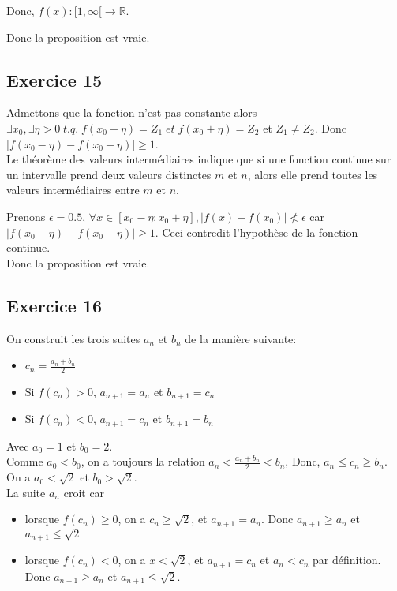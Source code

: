 \documentclass[]{book}
\theoremstyle{definition}
\newcommand{\bb}[1]{\mathbb{#1}}
\newcommand{\R}{\bb{R}}
\begin{document}
Donc, $f(x): [1,\infty[ \to \R$.


Donc la proposition est vraie.


\subsection*{Exercice 15}
Admettons que la fonction n'est pas constante alors $\exists x_0, \exists \eta > 0\; t.q.\; f(x_0 - \eta) = Z_1\; et \; f(x_0 + \eta) = Z_2$ et $Z_1 \neq Z_2$. Donc $|f(x_0 - \eta) - f(x_0 + \eta)| \ge 1$.\\ 


Le th\'eor\`eme des valeurs intermédiaires indique que si une fonction continue sur un intervalle prend deux valeurs distinctes $m$ et $n$, alors elle prend toutes les valeurs intermédiaires entre $m$ et $n$.

Prenons $\epsilon = 0.5$, $\forall x \in [x_0 - \eta;x_0 + \eta],  |f(x) - f(x_0)| \nless \epsilon$ car $|f(x_0 - \eta) - f(x_0 + \eta)| \ge 1$. Ceci contredit l'hypoth\`ese de la fonction continue.\\

Donc la proposition est vraie.

\subsection*{Exercice 16}
On construit les trois suites $a_n$ et $b_n$ de la mani\`ere suivante:
\begin{itemize}
\item $c_n = \frac{a_n + b_n}{2}$
\item Si $f(c_n) > 0$, $a_{n+1} = a_n$ et $b_{n+1} = c_n$
\item Si $f(c_n) < 0$, $a_{n+1} = c_n$ et $b_{n+1} = b_n$
\end{itemize}
Avec $a_0 = 1$ et $b_0 = 2$.\\

Comme $a_0 < b_0$, on a toujours la relation $a_n < \frac{a_n+b_n}{2} < b_n$, Donc, $a_n \le c_n \ge b_n$.\\
On a $a_0 < \sqrt{2}$ et $b_0 > \sqrt{2}$.\\
 
La suite $a_n$ croit car 
\begin{itemize}
\item lorsque $f(c_n) \ge 0$, on a $c_n \ge \sqrt{2}$, et $a_{n+1} = a_n$. Donc $a_{n+1} \ge a_{n}$ et $a_{n+1} \le \sqrt{2}$
\item lorsque $f(c_n) < 0$, on a $x < \sqrt{2}$, et $a_{n+1} = c_n$ et $a_n < c_n$ par d\'efinition. Donc $a_{n+1} \ge a_{n}$ et $a_{n+1} \le \sqrt{2}$.   
\end{itemize}
\end{document}
